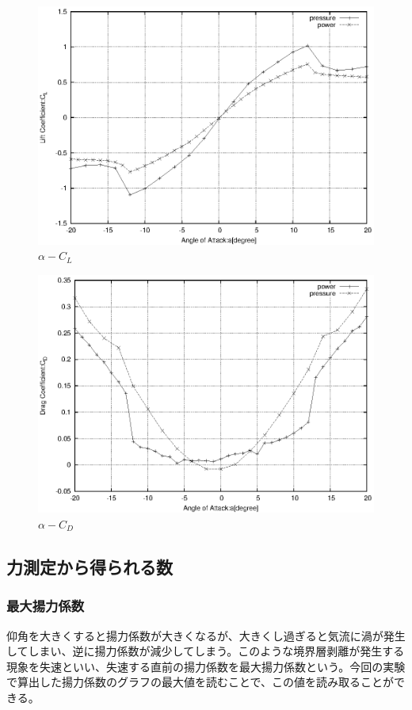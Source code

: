 \documentclass[a4j,twoside,openright,11pt]{jarticle}
\begin{document}
\begin{figure}[htbp]
\begin{center}
\includegraphics[width=12cm]{./2-CL-CD/CL-CD.eps}
\end{center}
\caption{$\alpha-C_L$}
\end{figure}

\begin{figure}[htb]
\begin{center}
\includegraphics[width=12cm]{./2-CL-CD/CD2.eps}
\end{center}
\caption{$\alpha-C_D$}
\end{figure}


\newpage
\subsection{力測定から得られる数}
\subsubsection{最大揚力係数}
仰角を大きくすると揚力係数が大きくなるが、大きくし過ぎると気流に渦が発生してしまい、逆に揚力係数が減少してしまう。このような境界層剥離が発生する現象を失速といい、失速する直前の揚力係数を最大揚力係数という。今回の実験で算出した揚力係数のグラフの最大値を読むことで、この値を読み取ることができる。
\end{document}
